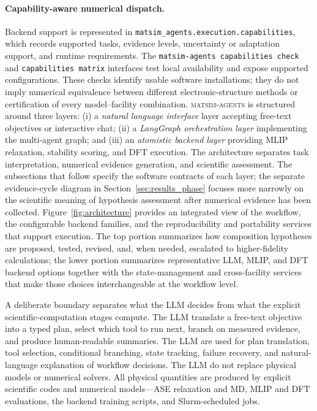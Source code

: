 \documentclass[11pt,a4paper]{article}
\def\ac#1{#1}%
\def\acp#1{#1}%
\begin{document}
\paragraph{Capability-aware numerical dispatch.}
Backend support is represented in \texttt{matsim\_agents.execution.capabilities}, which records supported tasks, evidence levels, uncertainty or adaptation support, and runtime requirements. The \texttt{matsim-agents capabilities check} and \texttt{capabilities matrix} interfaces test local availability and expose supported configurations. These checks identify usable software installations; they do not imply numerical equivalence between different electronic-structure methods or certification of every model--facility combination.
\textsc{matsim-agents} is structured around three layers:
(i) a \emph{natural language interface} layer accepting free-text objectives
or interactive chat; (ii) a \emph{LangGraph orchestration layer} implementing
the multi-agent graph; and (iii) an \emph{atomistic backend layer} providing
\ac{MLIP} relaxation, stability scoring, and \ac{DFT} execution. The architecture separates task interpretation, numerical evidence generation, and scientific assessment. The subsections that follow specify the software contracts of each layer; the separate evidence-cycle diagram in Section~\ref{sec:results_phase} focuses more narrowly on the scientific meaning of hypothesis assessment after numerical evidence has been collected.
Figure~\ref{fig:architecture} provides an integrated view of the workflow, the configurable backend families, and the reproducibility and portability services that support execution. The top portion summarizes how composition hypotheses are proposed, tested, revised, and, when needed, escalated to higher-fidelity calculations; the lower portion summarizes representative \ac{LLM}, \ac{MLIP}, and \ac{DFT} backend options together with the state-management and cross-facility services that make those choices interchangeable at the workflow level.

A deliberate boundary separates what the \ac{LLM} decides from what the
explicit scientific-computation stages compute. The \acp{LLM} translate a
free-text objective into a typed plan, select which tool to run next, branch on
measured evidence, and produce human-readable summaries. The \acp{LLM} are used for
plan translation, tool selection, conditional branching, state tracking, failure
recovery, and natural-language explanation of workflow decisions.
 The
\acp{LLM} do not replace physical models or numerical solvers.
All physical quantities are
produced by explicit scientific codes and numerical models---\ac{ASE} relaxation
and \ac{MD}, \ac{MLIP} and \ac{DFT} evaluations, the backend training scripts,
and Slurm-scheduled jobs.
\end{document}
